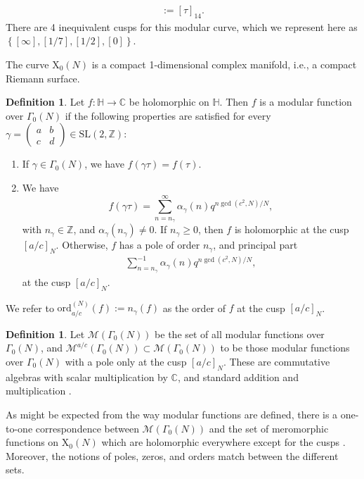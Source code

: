 \documentclass[reqno]{amsart}
\theoremstyle{definition}
\newtheorem{definition}[theorem]{Definition}
\theoremstyle{remark}
\numberwithin{equation}{section}
\begin{document}
\begin{align*}
[\tau] := [\tau]_{14}.
\end{align*}  There are 4 inequivalent cusps for this modular curve, which we represent here as $\left\{[\infty], [1/7], [1/2], [0]\right\}.$

The curve $\mathrm{X}_0(N)$ is a compact 1-dimensional complex manifold, i.e., a compact Riemann surface.
\begin{definition}\label{DefnModular}
Let $f:\mathbb{H}\longrightarrow\mathbb{C}$ be holomorphic on $\mathbb{H}$.  Then $f$ is a modular function over $\Gamma_0(N)$ if the following properties are satisfied for every $\gamma=\left(\begin{smallmatrix}
  a & b \\
  c & d 
 \end{smallmatrix}\right)\in\mathrm{SL}(2,\mathbb{Z})$:

\begin{enumerate}
\item If $\gamma\in\Gamma_0(N)$, we have $\displaystyle{f\left( \gamma\tau \right) = f(\tau)}.$
\item We have $$\displaystyle{f\left( \gamma\tau \right) = \sum_{n=n_{\gamma}}^{\infty}\alpha_{\gamma}(n)q^{n\gcd(c^2,N)/ N}},$$  with $n_{\gamma}\in\mathbb{Z}$, and $\alpha_{\gamma}(n_{\gamma})\neq 0$.  If $n_{\gamma}\ge 0$, then $f$ is holomorphic at the cusp $[a/c]_N$.  Otherwise, $f$ has a pole of order $n_{\gamma}$, and principal part
 \begin{align*}
 \sum_{n=n_{\gamma}}^{-1}\alpha_{\gamma}(n)q^{n\gcd(c^2,N)/ N},
 \end{align*} at the cusp $[a/c]_N$.
 \end{enumerate}  We refer to $\mathrm{ord}_{a/c}^{(N)}(f) := n_{\gamma}(f)$ as the order of $f$ at the cusp $[a/c]_N$.
\end{definition}

\begin{definition}
Let $\mathcal{M}\left(\Gamma_0(N)\right)$ be the set of all modular functions over $\Gamma_0(N)$, and $\mathcal{M}^{a/c}\left(\Gamma_0(N)\right)\subset \mathcal{M}\left(\Gamma_0(N)\right)$ to be those modular functions over $\Gamma_0(N)$ with a pole only at the cusp $[a/c]_N$.  These are commutative algebras with scalar multiplication by $\mathbb{C}$, and standard addition and multiplication \cite[Section 2.1]{Radu}.
\end{definition}

As might be expected from the way modular functions are defined, there is a one-to-one correspondence between $\mathcal{M}\left(\Gamma_0(N)\right)$ and the set of meromorphic functions on $\mathrm{X}_0(N)$ which are holomorphic everywhere except for the cusps \cite[Chapter VI, Theorem 4A]{Lehner}.  Moreover, the notions of poles, zeros, and orders match between the different sets.
\end{document}

